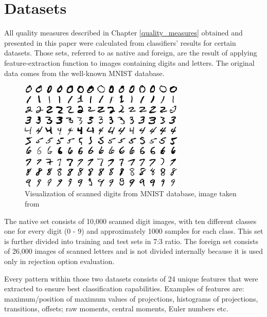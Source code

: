 \chapter{Datasets} \label{datasets}

All quality measures described in Chapter \ref{quality_measures} obtained and presented in this paper were calculated from classifiers' results for certain datasets. Those sets, referred to as native and foreign, are the result of applying feature-extraction function to images containing digits and letters. The original data comes from the well-known MNIST database\cite{MNIST}.

\begin{figure}[htp]
	\centering
	\includegraphics[width=0.7\textwidth]{Figures/mnistdigits.jpg}
	\caption{Visualization of scanned digits from MNIST database, image taken from \cite{Kuan_Hoong_Blog}}
	\label{fig:mnist_digits}\vspace{-3pt}
\end{figure}

The native set consists of 10,000 scanned digit images, with ten different classes one for every digit (0 - 9) and approximately 1000 samples for each class. This set is further divided into training and test sets in 7:3 ratio. The foreign set consists of 26,000 images of scanned letters and is not divided internally because it is used only in rejection option evaluation.

Every pattern within those two datasets consists of 24 unique features that were extracted to ensure best classification capabilities. Examples of features are: maximum/position of maximum values of projections, histograms of projections, transitions, offsets; raw moments, central moments, Euler numbers etc. 